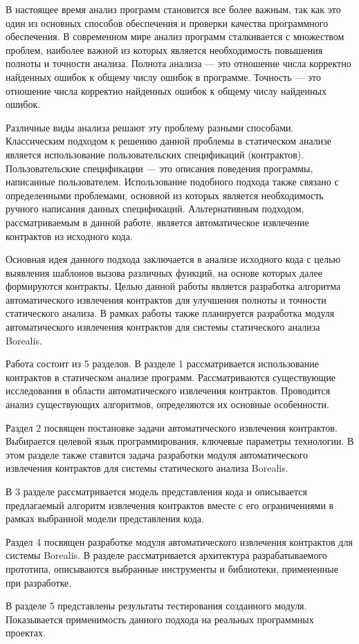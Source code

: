 \intro
В настоящее время анализ программ становится все более важным, так как это один из основных способов обеспечения и проверки качества программного обеспечения. В современном мире анализ программ сталкивается с множеством проблем, наиболее важной из которых является необходимость повышения полноты и точности анализа. Полнота анализа --- это отношение числа корректно найденных ошибок к общему числу ошибок в программе. Точность --- это отношение числа корректно найденных ошибок к общему числу найденных ошибок.

Различные виды анализа решают эту проблему разными способами. Классическим подходом к решению данной проблемы в статическом анализе является использование пользовательских спецификаций (контрактов). Пользовательские спецификации --- это описания поведения программы, написанные пользователем. Использование подобного подхода также связано с определенными проблемами, основной из которых является необходимость ручного написания данных спецификаций. Альтернативным подходом, рассматриваемым в данной работе, является автоматическое извлечение контрактов из исходного кода.

Основная идея данного подхода заключается в анализе исходного кода с целью выявления шаблонов вызова различных функций, на основе которых далее формируются контракты. Целью данной работы является разработка алгоритма автоматического извлечения контрактов для улучшения полноты и точности статического анализа. В рамках работы также планируется разработка модуля автоматического извлечения контрактов для системы статического анализа Borealis\cite{borealis}.

Работа состоит из 5 разделов. В разделе 1 рассматривается использование контрактов в статическом анализе программ. Рассматриваются существующие исследования в области автоматического извлечения контрактов. Проводится анализ существующих алгоритмов, определяются их основные особенности.

Раздел 2 посвящен постановке задачи автоматического извлечения контрактов. Выбирается целевой язык программирования, ключевые параметры технологии. В этом разделе также ставится задача разработки модуля автоматического извлечения контрактов для системы статического анализа Borealis.

В 3 разделе рассматривается модель представления кода и описывается предлагаемый алгоритм извлечения контрактов вместе с его ограничениями в рамках выбранной модели представления кода.

Раздел 4 посвящен разработке модуля автоматического извлечения контрактов для системы Borealis. В разделе рассматривается архитектура разрабатываемого прототипа, описываются выбранные инструменты и библиотеки, примененные при разработке.

В разделе 5 представлены результаты тестирования созданного модуля. Показывается применимость данного подхода на реальных программных проектах.
